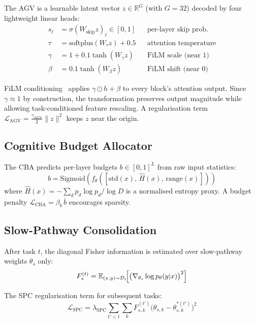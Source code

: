 \documentclass[10pt,twocolumn]{article}
\begin{document}
The AGV is a learnable latent vector $z \in \mathbb{R}^G$ (with $G = 32$) decoded
by four lightweight linear heads:
\begin{align}
  s_\ell &= \sigma(W_{\mathrm{skip}} z)_\ell \in [0,1] && \text{per-layer skip prob.} \\
  \tau   &= \mathrm{softplus}(W_\tau z) + 0.5           && \text{attention temperature} \\
  \gamma &= 1 + 0.1 \tanh(W_\gamma z)                  && \text{FiLM scale (near 1)} \\
  \beta  &= 0.1 \tanh(W_\beta z)                        && \text{FiLM shift (near 0)}
\end{align}

FiLM conditioning~\citep{perez2018film} applies $\gamma \odot h + \beta$ to every
block's attention output. Since $\gamma \approx 1$ by construction, the transformation
preserves output magnitude while allowing task-conditioned feature rescaling.
A regularisation term $\mathcal{L}_{\mathrm{AGV}} = \frac{\gamma_{\mathrm{AGV}}}{2} \|z\|^2$
keeps $z$ near the origin.

\subsection{Cognitive Budget Allocator}
\label{sec:cba}

The CBA predicts per-layer budgets $b \in [0,1]^L$ from raw input statistics:
\begin{equation}
  b = \mathrm{Sigmoid}\!\left(f_\theta\!\left([\mathrm{std}(x),\, \hat{H}(x),\, \mathrm{range}(x)]\right)\right)
\end{equation}
where $\hat{H}(x) = -\sum_d p_d \log p_d / \log D$ is a normalised entropy proxy.
A budget penalty $\mathcal{L}_{\mathrm{CBA}} = \beta_b \, \bar{b}$ encourages sparsity.

\subsection{Slow-Pathway Consolidation}
\label{sec:spc}

After task $t$, the diagonal Fisher information is estimated over slow-pathway
weights $\theta_s$ only:
\begin{equation}
  F_s^{(t)} = \mathbb{E}_{(x,y) \sim \mathcal{D}_t}\!\Bigl[\bigl(\nabla_{\theta_s} \log p_\theta(y|x)\bigr)^2\Bigr]
\end{equation}

The SPC regularisation term for subsequent tasks:
\begin{equation}
  \mathcal{L}_{\mathrm{SPC}} = \lambda_{\mathrm{SPC}} \sum_{t' < t} \sum_{k}
    F_{s,k}^{(t')} \bigl(\theta_{s,k} - \theta_{s,k}^{*(t')}\bigr)^2
\end{equation}
\end{document}
